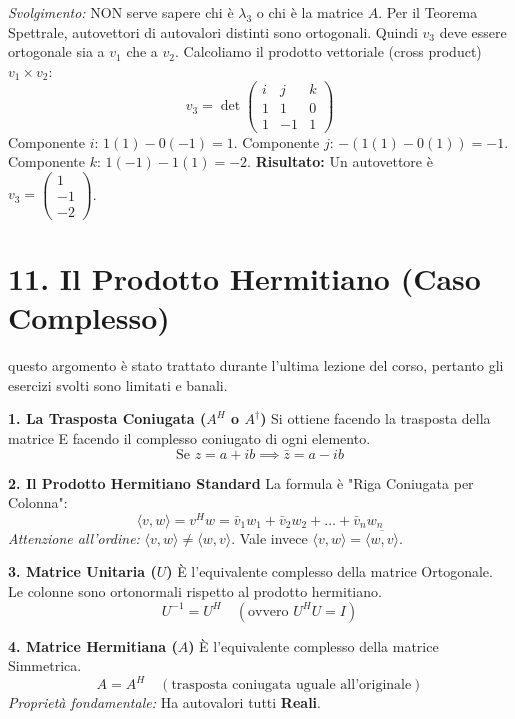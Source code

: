 \documentclass[10pt,a4paper]{article}
\begin{document}
\textit{Svolgimento:}
NON serve sapere chi è $\lambda_3$ o chi è la matrice $A$.
Per il Teorema Spettrale, autovettori di autovalori distinti sono ortogonali.
Quindi $v_3$ deve essere ortogonale sia a $v_1$ che a $v_2$.
Calcoliamo il prodotto vettoriale (cross product) $v_1 \times v_2$:
\[ v_3 = \det \begin{pmatrix} i & j & k \\ 1 & 1 & 0 \\ 1 & -1 & 1 \end{pmatrix} \]
Componente $i$: $1(1) - 0(-1) = 1$.
Componente $j$: $-(1(1) - 0(1)) = -1$.
Componente $k$: $1(-1) - 1(1) = -2$.
\textbf{Risultato:} Un autovettore è $v_3 = \begin{pmatrix} 1 \\ -1 \\ -2 \end{pmatrix}$.

\section*{11. Il Prodotto Hermitiano (Caso Complesso)}

questo argomento è stato trattato durante l'ultima lezione del corso, pertanto gli esercizi svolti sono limitati e banali.
\begin{tcolorbox}[colback=cyan!5!white,colframe=cyan!75!black,title=\textbf{}]
\textbf{1. La Trasposta Coniugata ($A^H$ o $A^\dagger$)}
Si ottiene facendo la trasposta della matrice E facendo il complesso coniugato di ogni elemento.
\[ \text{Se } z = a+ib \implies \bar{z} = a-ib \]

\textbf{2. Il Prodotto Hermitiano Standard}
La formula è "Riga Coniugata per Colonna":
\[ \langle v, w \rangle = v^H w = \bar{v}_1 w_1 + \bar{v}_2 w_2 + \dots + \bar{v}_n w_n \]
\textit{Attenzione all'ordine:} $\langle v, w \rangle \neq \langle w, v \rangle$. Vale invece $\langle v, w \rangle = \overline{\langle w, v \rangle}$.

\textbf{3. Matrice Unitaria ($U$)}
È l'equivalente complesso della matrice Ortogonale.
Le colonne sono ortonormali rispetto al prodotto hermitiano.
\[ U^{-1} = U^H \quad (\text{ovvero } U^H U = I) \]

\textbf{4. Matrice Hermitiana ($A$)}
È l'equivalente complesso della matrice Simmetrica.
\[ A = A^H \quad (\text{trasposta coniugata uguale all'originale}) \]
\textit{Proprietà fondamentale:} Ha autovalori tutti \textbf{Reali}.
\end{tcolorbox}
\end{document}
